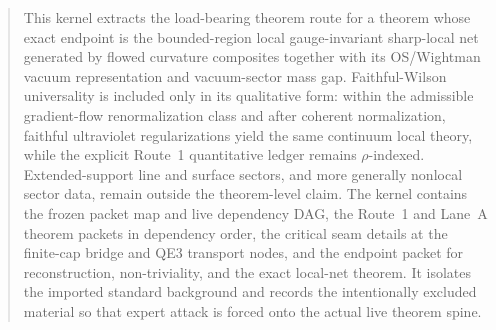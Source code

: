 \documentclass[preprint,aip,jmp,amsmath,amssymb,nofootinbib]{revtex4-2}
\begin{document}
\renewcommand{\proofsynopsis}[1]{}
\begin{abstract}
This kernel extracts the load-bearing theorem route for a theorem whose exact endpoint is the bounded-region local gauge-invariant sharp-local net generated by flowed curvature composites together with its OS/Wightman vacuum representation and vacuum-sector mass gap. Faithful-Wilson universality is included only in its qualitative form: within the admissible gradient-flow renormalization class and after coherent normalization, faithful ultraviolet regularizations yield the same continuum local theory, while the explicit Route~1 quantitative ledger remains $\rho$-indexed. Extended-support line and surface sectors, and more generally nonlocal sector data, remain outside the theorem-level claim. The kernel contains the frozen packet map and live dependency DAG, the Route~1 and Lane~A theorem packets in dependency order, the critical seam details at the finite-cap bridge and QE3 transport nodes, and the endpoint packet for reconstruction, non-triviality, and the exact local-net theorem. It isolates the imported standard background and records the intentionally excluded material so that expert attack is forced onto the actual live theorem spine.
\end{abstract}
\maketitle









\SuiteDataAvailabilitySection
\appendix






\end{document}
